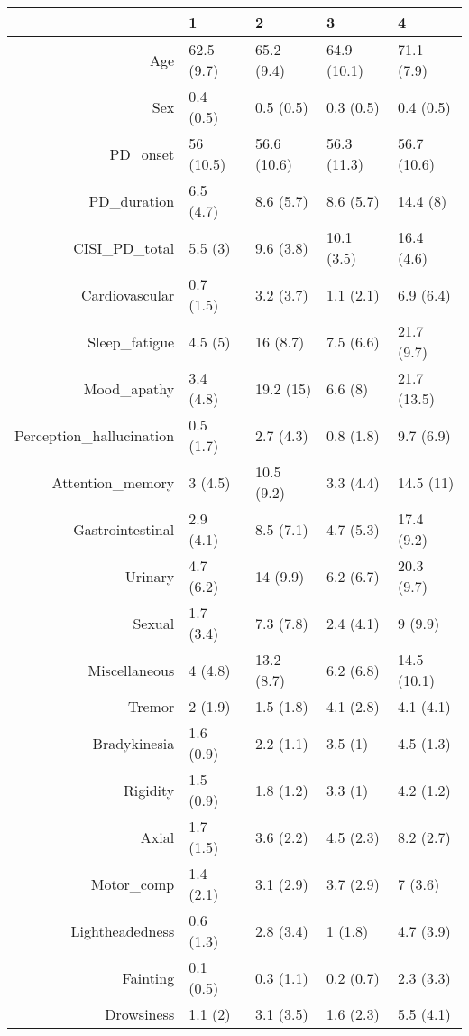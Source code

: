 \begin{table}[ht]
\centering
\begin{tabular}{rllll}
  \toprule
 & 1 & 2 & 3 & 4 \\ 
  \midrule
Age & 62.5 (9.7) & 65.2 (9.4) & 64.9 (10.1) & 71.1 (7.9) \\ 
  Sex & 0.4 (0.5) & 0.5 (0.5) & 0.3 (0.5) & 0.4 (0.5) \\ 
  PD\_onset & 56 (10.5) & 56.6 (10.6) & 56.3 (11.3) & 56.7 (10.6) \\ 
  PD\_duration & 6.5 (4.7) & 8.6 (5.7) & 8.6 (5.7) & 14.4 (8) \\ 
  CISI\_PD\_total & 5.5 (3) & 9.6 (3.8) & 10.1 (3.5) & 16.4 (4.6) \\ 
  Cardiovascular & 0.7 (1.5) & 3.2 (3.7) & 1.1 (2.1) & 6.9 (6.4) \\ 
  Sleep\_fatigue & 4.5 (5) & 16 (8.7) & 7.5 (6.6) & 21.7 (9.7) \\ 
  Mood\_apathy & 3.4 (4.8) & 19.2 (15) & 6.6 (8) & 21.7 (13.5) \\ 
  Perception\_hallucination & 0.5 (1.7) & 2.7 (4.3) & 0.8 (1.8) & 9.7 (6.9) \\ 
  Attention\_memory & 3 (4.5) & 10.5 (9.2) & 3.3 (4.4) & 14.5 (11) \\ 
  Gastrointestinal & 2.9 (4.1) & 8.5 (7.1) & 4.7 (5.3) & 17.4 (9.2) \\ 
  Urinary & 4.7 (6.2) & 14 (9.9) & 6.2 (6.7) & 20.3 (9.7) \\ 
  Sexual & 1.7 (3.4) & 7.3 (7.8) & 2.4 (4.1) & 9 (9.9) \\ 
  Miscellaneous & 4 (4.8) & 13.2 (8.7) & 6.2 (6.8) & 14.5 (10.1) \\ 
  Tremor & 2 (1.9) & 1.5 (1.8) & 4.1 (2.8) & 4.1 (4.1) \\ 
  Bradykinesia & 1.6 (0.9) & 2.2 (1.1) & 3.5 (1) & 4.5 (1.3) \\ 
  Rigidity & 1.5 (0.9) & 1.8 (1.2) & 3.3 (1) & 4.2 (1.2) \\ 
  Axial & 1.7 (1.5) & 3.6 (2.2) & 4.5 (2.3) & 8.2 (2.7) \\ 
  Motor\_comp & 1.4 (2.1) & 3.1 (2.9) & 3.7 (2.9) & 7 (3.6) \\ 
  Lightheadedness & 0.6 (1.3) & 2.8 (3.4) & 1 (1.8) & 4.7 (3.9) \\ 
  Fainting & 0.1 (0.5) & 0.3 (1.1) & 0.2 (0.7) & 2.3 (3.3) \\ 
  Drowsiness & 1.1 (2) & 3.1 (3.5) & 1.6 (2.3) & 5.5 (4.1) \\ 

\end{tabular}
\end{table}
